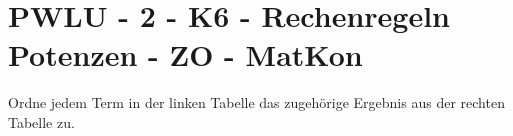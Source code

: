 \section{PWLU - 2 - K6 - Rechenregeln Potenzen - ZO - MatKon}

\begin{beispiel}[PWLU]{1}
Ordne jedem Term in der linken Tabelle das zugehörige Ergebnis aus der rechten Tabelle zu.\vspace{0,2cm}

\end{beispiel}